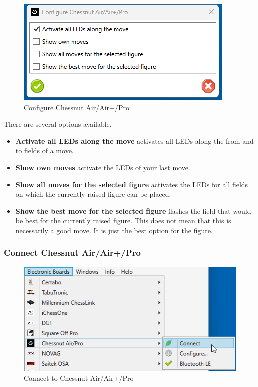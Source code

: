 \documentclass[11pt,a4paper]{article}
\begin{document}
\begin{figure}[H]
	\centering
	\includegraphics[scale=1.0]{ChessnutAir6.png}
	\caption{Configure Chessnut Air/Air+/Pro}
	\label{fig:ChessnutAir6}
\end{figure}

There are several options available.
\begin{itemize}
	\item \textbf{Activate all LEDs along the move} activates all LEDs along the from and to fields of a move.
	\item \textbf{Show own moves} activate the LEDs of your last move.
	\item \textbf{Show all moves for the selected figure} activates the LEDs for all fields on which the currently raised figure can be placed.
	\item \textbf{Show the best move for the selected figure} flashes the field that would be best for the currently raised figure. This does not mean that this is necessarily a good move. It is just the best option for the figure.
\end{itemize}

\subsubsection{Connect Chessnut Air/Air+/Pro} \label{ConnectChessnutAir}
\begin{figure}[H]
	\centering
	\includegraphics[scale=1.0]{ChessnutAir1.png}
	\caption{Connect to Chessnut Air/Air+/Pro}
	\label{fig:ChessnutAir1}
\end{figure}
\end{document}
